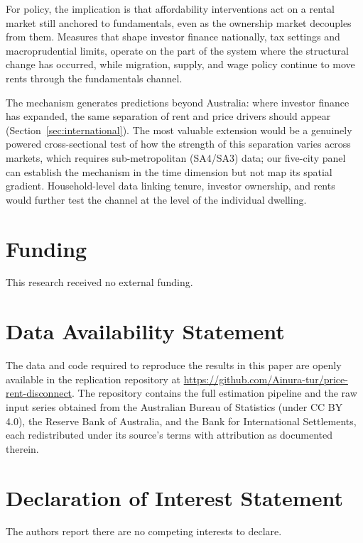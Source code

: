 \documentclass[preprint,11pt,authoryear]{elsarticle}
\begin{document}
For policy, the implication is that affordability interventions act on
a rental market still anchored to fundamentals, even as the ownership
market decouples from them. Measures that shape investor finance
nationally, tax settings and macroprudential limits, operate on the
part of the system where the structural change has occurred, while
migration, supply, and wage policy continue to move rents through the
fundamentals channel.

The mechanism generates predictions beyond Australia: where investor
finance has expanded, the same separation of rent and price drivers
should appear (Section~\ref{sec:international}). The most valuable
extension would be a genuinely powered cross-sectional test of how the
strength of this separation varies across markets, which requires
sub-metropolitan (SA4/SA3) data; our five-city panel can establish the
mechanism in the time dimension but not map its spatial gradient.
Household-level data linking tenure, investor ownership, and rents
would further test the channel at the level of the individual dwelling.


\section*{Funding}
This research received no external funding.

\section*{Data Availability Statement}
The data and code required to reproduce the results in this paper are
openly available in the replication repository at
\url{https://github.com/Ainura-tur/price-rent-disconnect}. The
repository contains the full estimation pipeline and the raw input
series obtained from the Australian Bureau of Statistics (under
CC BY 4.0), the Reserve Bank of Australia, and the Bank for
International Settlements, each redistributed under its source's terms
with attribution as documented therein.

\section*{Declaration of Interest Statement}
The authors report there are no competing interests to declare.
\end{document}
